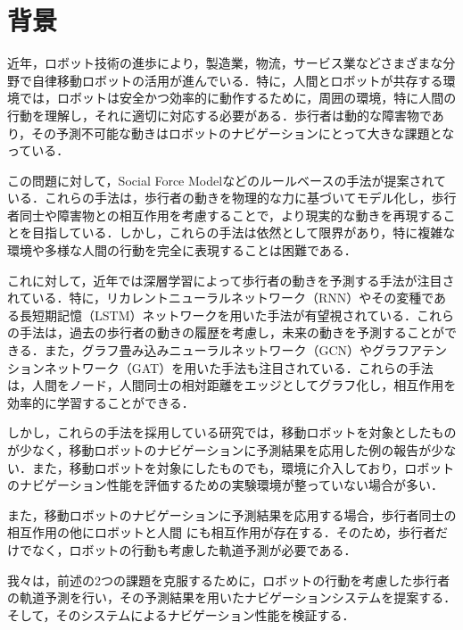 
\section{背景}
近年，ロボット技術の進歩により，製造業，物流，サービス業などさまざまな分野で自律移動ロボットの活用が進んでいる．特に，人間とロボットが共存する環境では，ロボットは安全かつ効率的に動作するために，周囲の環境，特に人間の行動を理解し，それに適切に対応する必要がある．歩行者は動的な障害物であり，その予測不可能な動きはロボットのナビゲーションにとって大きな課題となっている．

この問題に対して，Social Force Model\cite{s-lstm}などのルールベースの手法が提案されている．これらの手法は，歩行者の動きを物理的な力に基づいてモデル化し，歩行者同士や障害物との相互作用を考慮することで，より現実的な動きを再現することを目指している．しかし，これらの手法は依然として限界があり，特に複雑な環境や多様な人間の行動を完全に表現することは困難である．

これに対して，近年では深層学習によって歩行者の動きを予測する手法が注目されている．特に，リカレントニューラルネットワーク（RNN）\cite{rumelhart1986learning1,rumelhart1986learning2}やその変種である長短期記憶（LSTM）\cite{hochreiter1997long}ネットワークを用いた手法が有望視されている．これらの手法は，過去の歩行者の動きの履歴を考慮し，未来の動きを予測することができる．また，グラフ畳み込みニューラルネットワーク（GCN）\cite{kipf2016semi-gcn}やグラフアテンションネットワーク（GAT）\cite{velickovic2017graph-gat}を用いた手法も注目されている．これらの手法は，人間をノード，人間同士の相対距離をエッジとしてグラフ化し，相互作用を効率的に学習することができる．

しかし，これらの手法を採用している研究では，移動ロボットを対象としたものが少なく，移動ロボットのナビゲーションに予測結果を応用した例の報告が少ない．また，移動ロボットを対象にしたものでも，環境に介入しており，ロボットのナビゲーション性能を評価するための実験環境が整っていない場合が多い．

また，移動ロボットのナビゲーションに予測結果を応用する場合，歩行者同士の相互作用の他にロボットと人間
にも相互作用が存在する．そのため，歩行者だけでなく，ロボットの行動も考慮した軌道予測が必要である．

我々は，前述の2つの課題を克服するために，ロボットの行動を考慮した歩行者の軌道予測を行い，その予測結果を用いたナビゲーションシステムを提案する．そして，そのシステムによるナビゲーション性能を検証する．


\newpage
